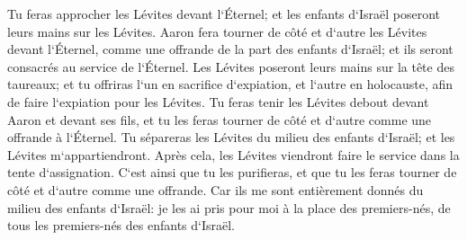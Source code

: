 \verse Tu feras approcher les Lévites devant l`Éternel; et les enfants d`Israël poseront leurs mains sur les Lévites. 
\verse Aaron fera tourner de côté et d`autre les Lévites devant l`Éternel, comme une offrande de la part des enfants d`Israël; et ils seront consacrés au service de l`Éternel. 
\verse Les Lévites poseront leurs mains sur la tête des taureaux; et tu offriras l`un en sacrifice d`expiation, et l`autre en holocauste, afin de faire l`expiation pour les Lévites. 
\verse Tu feras tenir les Lévites debout devant Aaron et devant ses fils, et tu les feras tourner de côté et d`autre comme une offrande à l`Éternel. 
\verse Tu sépareras les Lévites du milieu des enfants d`Israël; et les Lévites m`appartiendront. 
\verse Après cela, les Lévites viendront faire le service dans la tente d`assignation. C`est ainsi que tu les purifieras, et que tu les feras tourner de côté et d`autre comme une offrande. 
\verse Car ils me sont entièrement donnés du milieu des enfants d`Israël: je les ai pris pour moi à la place des premiers-nés, de tous les premiers-nés des enfants d`Israël. 

